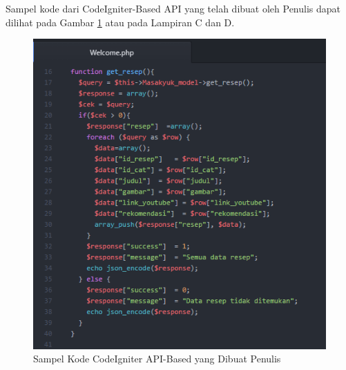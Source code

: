 		Sampel kode dari CodeIgniter-Based API yang telah dibuat oleh Penulis dapat dilihat pada Gambar \ref{ci_sample_api} atau pada Lampiran C dan D.
		\begin{figure}[H]
			\centering
			\includegraphics[width=1\textwidth]{gambar/sample-api-ci}
			\caption{Sampel Kode CodeIgniter API-Based yang Dibuat Penulis}
			\label{ci_sample_api}
		\end{figure}
	
